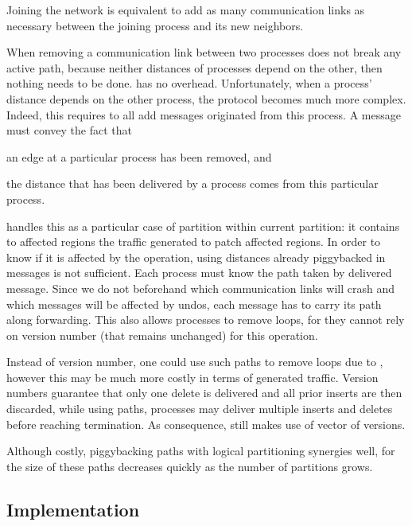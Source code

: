 \noindent Joining the network is equivalent to add as many
communication links as necessary between the joining process and its
new neighbors.

When removing a communication link between two processes does not
break any active path, because neither distances of processes depend
on the other, then nothing needs to be done. \NAME has no overhead.
Unfortunately, when a process' distance depends on the other process,
the protocol becomes much more complex. Indeed, this requires to
 all add messages originated from this process. A message
must convey the fact that
\begin{inparaenum}[(i)]
\item an edge at a particular process has been removed, and
\item the distance that has been delivered by a process comes from
  this particular process.
\end{inparaenum}

\noindent \NAME handles this as a particular case of partition within
current partition: it contains to affected regions the traffic
generated to patch affected regions. In order to know if it is
affected by the  operation, using distances already
piggybacked in messages is not sufficient.  Each process must know the
path taken by delivered message. Since we do not beforehand which
communication links will crash and which messages will be affected by
undos, each message has to carry its path along forwarding. This also
allows processes to remove loops, for they cannot rely on version
number (that remains unchanged) for this operation.

\noindent Instead of version number, one could use such paths to remove loops
due to , however this may be much more costly in
terms of generated traffic. Version numbers guarantee that only one
delete is delivered and all prior inserts are then discarded, while
using paths, processes may deliver multiple inserts and deletes before
reaching termination.  As
consequence, \NAME still makes use of vector of versions.

\noindent Although costly, piggybacking paths with logical partitioning synergies
well, for the size of these paths decreases quickly as the number of
partitions grows.

\subsection{Implementation}

